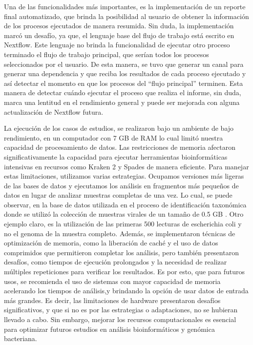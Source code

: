\documentclass[12pt]{article}
\begin{document}
Una de las funcionalidades más importantes, es la implementación de un reporte 
final automatizado, que brinda la posibilidad al usuario de obtener la información 
de los procesos ejecutados de manera resumida. Sin duda, la implementación marcó un 
desafío, ya que, el lenguaje base del flujo de trabajo está escrito en Nextflow. Este 
lenguaje no brinda la funcionalidad de ejecutar otro proceso terminado el flujo de 
trabajo principal, que serían todos los procesos seleccionados por el usuario. De esta 
manera, se tuvo que generar un canal para generar una dependencia y que reciba los 
resultados de cada proceso ejecutado y así detectar el momento en que los procesos del 
“flujo principal” terminen. Esta manera de detectar cuándo ejecutar el proceso que 
realiza el informe, sin duda, marca una lentitud en el rendimiento general y puede 
ser mejorada con alguna actualización de Nextflow futura.

	
La ejecución de los casos de estudios, se realizaron bajo un ambiente de bajo 
rendimiento, en un computador con 7 GB de RAM lo cual limitó nuestra capacidad 
de procesamiento de datos. Las restricciones de memoria afectaron significativamente 
la capacidad para ejecutar herramientas bioinformáticas intensivas en recursos como 
Kraken 2 y Spades de manera eficiente. Para manejar estas limitaciones, utilizamos 
varias estrategias. Ocupamos versiones más ligeras de las bases de datos y ejecutamos 
los análisis en fragmentos más pequeños de datos en lugar de analizar muestras 
completas de una vez. Lo cual, se puede observar, en la base de datos utilizada en 
el proceso de identificación taxonómica donde se utilizó la colección de muestras 
virales de un tamaño de 0.5 GB . Otro ejemplo claro, es la utilización de las primeras 
500 lecturas de escherichia coli y no el genoma de la muestra completo. Además, 
se implementaron técnicas de optimización de memoria, como la liberación de caché y el 
uso de datos comprimidos que permitieron completar los análisis, pero también presentaron 
desafíos, como tiempos de ejecución prolongados y la necesidad de realizar múltiples 
repeticiones para verificar los resultados. Es por esto, que para futuros usos, 
se recomienda el uso de sistemas con mayor capacidad de memoria acelerando los tiempos 
de análisis,y brindando la opción de usar datos de entrada más grandes. Es decir, las 
limitaciones de hardware presentaron desafíos significativos, y que si no es por las 
estrategias o adaptaciones, no se hubieran llevado a cabo. Sin embargo, mejorar los 
recursos computacionales es esencial para optimizar futuros estudios en análisis 
bioinformáticos y genómica bacteriana.
\end{document}
